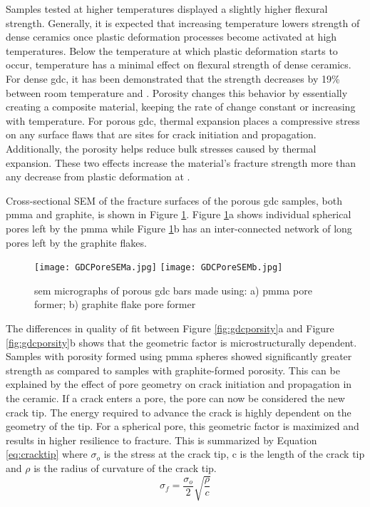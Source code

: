 Samples tested at higher temperatures displayed a slightly higher flexural strength.
Generally, it is expected that increasing temperature lowers strength of dense ceramics once plastic deformation processes become activated at high temperatures.\cite{Davidge1970}
Below the temperature at which plastic deformation starts to occur, temperature has a minimal effect on flexural strength of dense ceramics.
For dense \gls{gdc}, it has been demonstrated that the strength decreases by 19\% between room temperature and .\cite{Mogensen2000}
Porosity changes this behavior by essentially creating a composite material, keeping the rate of change constant or increasing with temperature.\cite{Giraud2008}
For porous \gls{gdc}, thermal expansion places a compressive stress on any surface flaws that are sites for crack initiation and propagation.
Additionally, the porosity helps reduce bulk stresses caused by thermal expansion.
These two effects increase the material's fracture strength more than any decrease from plastic deformation at .

Cross-sectional SEM of the fracture surfaces of the porous \gls{gdc} samples, both \gls{pmma} and graphite, is shown in Figure \ref{fig:GDCPoreSEM}.
Figure \ref{fig:GDCPoreSEM}a shows individual spherical pores left by the \gls{pmma} while Figure \ref{fig:GDCPoreSEM}b has an inter-connected network of long pores left by the graphite flakes.
\begin{figure}
    \texttt{[image: GDCPoreSEMa.jpg]}
    \texttt{[image: GDCPoreSEMb.jpg]}
    \caption{\Gls{sem} micrographs of porous \gls{gdc} bars made using: a) \gls{pmma} pore former; b) graphite flake pore former}
    \label{fig:GDCPoreSEM}
\end{figure}

The differences in quality of fit between Figure \ref{fig:gdcporsity}a and Figure \ref{fig:gdcporsity}b shows that the geometric factor is microstructurally dependent.
Samples with porosity formed using \gls{pmma} spheres showed significantly greater strength as compared to samples with graphite-formed porosity.
This can be explained by the effect of pore geometry on crack initiation and propagation in the ceramic.
If a crack enters a pore, the pore can now be considered the new crack tip.
The energy required to advance the crack is highly dependent on the geometry of the tip.
For a spherical pore, this geometric factor is maximized and results in higher resilience to fracture.
This is summarized by Equation \ref{eq:cracktip} where \(\sigma_{o}\) is the stress at the crack tip, c is the length of the crack tip and \(\rho\) is the radius of curvature of the crack tip.\cite{Carter2007}
\begin{equation}
    \sigma_{f} = \frac{\sigma_{o}}{2}\sqrt{\frac{\rho}{c}}
    \label{eq:cracktip}
\end{equation}

